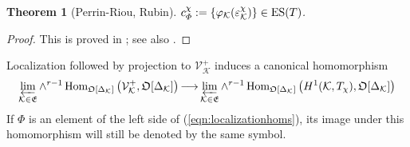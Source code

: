 \documentclass[12pt]{amsart}
\numberwithin{equation}{section}
\newtheorem{thm}{Theorem}[section]
\begin{document}
\begin{thm}[Perrin-Riou, Rubin]
\label{thm:pr-rubin}
 $c_{\varPhi}^\chi:=\{\varphi_{\mathcal{K}}(\varepsilon_{\mathcal{K}}^\chi)\}\in \textup{ES}(T)$.
\end{thm}
\begin{proof}This is proved in \cite[\S1.2.3]{pr-es}; see also \cite[\S6]{ru96}.
\end{proof}

Localization followed by projection to $\mathcal{V}^+_{\mathcal{K}}$ induces a canonical homomorphism
\begin{equation}\label{eqn:localizationhoms}{
\varprojlim_{{\mathcal{K}} \in \frak{E}} \wedge^{r-1}\,\hbox{Hom}_{{\frak{O}}[\Delta_{\mathcal{K}}]}\left(\mathcal{V}_{\mathcal{K}}^+, {\frak{O}}[\Delta_{\mathcal{K}}]\right) {\longrightarrow}
\varprojlim_{{\mathcal{K}} \in \frak{E}} \wedge^{r-1}\,\hbox{Hom}_{{\frak{O}}[\Delta_{\mathcal{K}}]}\left(H^1({\mathcal{K}},T_\chi), {\frak{O}}[\Delta_{\mathcal{K}}]\right)
}
\end{equation}
If $\varPhi$ is an element of the left side of (\ref{eqn:localizationhoms}), its image under this homomorphism will still be denoted by the same symbol.
\end{document}
